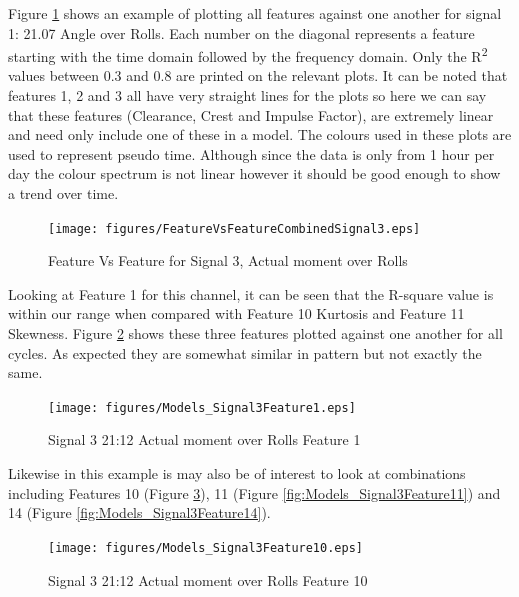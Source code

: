 \documentclass[]{article}
\begin{document}
Figure \ref{fig:FeatureVsFeatureCombinedSignal3} shows an example of plotting all features against one another for signal 1: 21.07 Angle over Rolls. Each number on the diagonal represents a feature starting with the time domain followed by the frequency domain. Only the R\textsuperscript{2} values between 0.3 and 0.8 are printed on the relevant plots. It can be noted that features 1, 2 and 3 all have very straight lines for the plots so here we can say that these features (Clearance, Crest and Impulse Factor), are extremely linear and need only include one of these in a model.
The colours used in these plots are used to represent pseudo time. Although since the data is only from 1 hour per day the colour spectrum is not linear however it should be good enough to show a trend over time.
\begin{figure}[H]
    \centering
    \texttt{[image: figures/FeatureVsFeatureCombinedSignal3.eps]}
    \caption{Feature Vs Feature for Signal 3, Actual moment over Rolls}
    \label{fig:FeatureVsFeatureCombinedSignal3}
\end{figure}

Looking at Feature 1 for this channel, it can be seen that the R-square value is within our range when compared with Feature 10 Kurtosis and Feature 11 Skewness. Figure \ref{fig:Models_Signal3Feature1} shows these three features plotted against one another for all cycles. As expected they are somewhat similar in pattern but not exactly the same.
\begin{figure}[H]
    \centering
    \texttt{[image: figures/Models\_Signal3Feature1.eps]}
    \caption{Signal 3 21:12 Actual moment over Rolls Feature 1}
    \label{fig:Models_Signal3Feature1}
\end{figure}
Likewise in this example is may also be of interest to look at combinations including Features 10 (Figure \ref{fig:Models_Signal3Feature10}), 11 (Figure \ref{fig:Models_Signal3Feature11}) and 14 (Figure \ref{fig:Models_Signal3Feature14}).
\begin{figure}[H]
    \centering
    \texttt{[image: figures/Models\_Signal3Feature10.eps]}
    \caption{Signal 3 21:12 Actual moment over Rolls Feature 10}
    \label{fig:Models_Signal3Feature10}
\end{figure}
 
\end{document}
